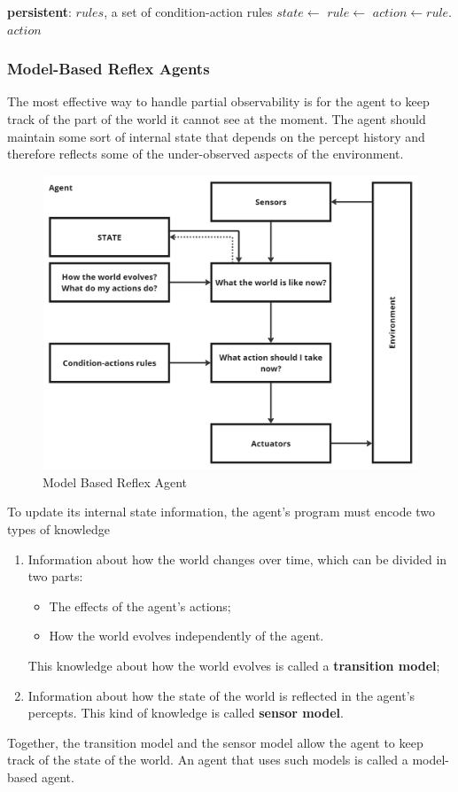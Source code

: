 \documentclass{article}
\begin{document}
\vspace{5mm}
\begin{algorithmic}
    \State \textbf{persistent}: $rules$, a set of condition-action rules
    \State
    \State $state \gets$ 
    \State $rule\gets$ 
    \State $action\gets rule.$
    \State \Return $action$
\EndFunction
\end{algorithmic}
\vspace{5mm}

\subsubsection{Model-Based Reflex Agents}
The most effective way to handle partial observability is for the agent to keep track of the part of the world it cannot see at the moment. The agent should maintain some sort of internal state that depends on the percept history and therefore reflects some of the under-observed aspects of the environment.

\clearpage
\begin{figure}[h]
    \centering
    \includegraphics[width=0.5\linewidth]{images/Model Based Reflex Agent.jpg}
    \caption{Model Based Reflex Agent}
    \label{fig:model_based_reflex_agent}
\end{figure}

To update its internal state information, the agent's program must encode two types of knowledge
\begin{enumerate}
    \item Information about how the world changes over time, which can be divided in two parts:
    \begin{itemize}
        \item The effects of the agent's actions;
        \item How the world evolves independently of the agent.
    \end{itemize}
    This knowledge about how the world evolves is called a \textbf{transition model};
    \item Information about how the state of the world is reflected in the agent's percepts. This kind of knowledge is called \textbf{sensor model}.
\end{enumerate}
Together, the transition model and the sensor model allow the agent to keep track of the state of the world. An agent that uses such models is called a model-based agent.
\end{document}
